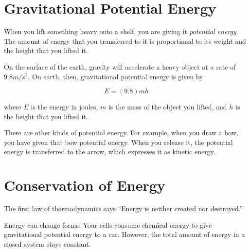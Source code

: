 \section{Gravitational Potential Energy}

When you lift something heavy onto a shelf, you are giving it
\textit{potential energy}. The amount of energy that you transferred
to it is proportional to its weight and the height that you lifted it.

On the surface of the earth, gravity will accelerate a heavy object at
a rate of $9.8 m/s^2$. On earth, then, gravitational potential energy is given by

$$E = (9.8)mh$$

where $E$ is the energy in joules, $m$ is the mass of the object you
lifted, and $h$ is the height that you lifted it.

There are other kinds of potential energy. For example, when you draw
a bow, you have given that bow potential energy. When you release it,
the potential energy is transferred to the arrow, which expresses it
as kinetic energy.

\section{Conservation of Energy}

The first law of thermodynamics says ``Energy is neither created nor
destroyed.''

Energy can change forms: Your cells consume chemical energy to give
gravitational potential energy to a car.  However, the total amount of
energy in a closed system stays constant.
